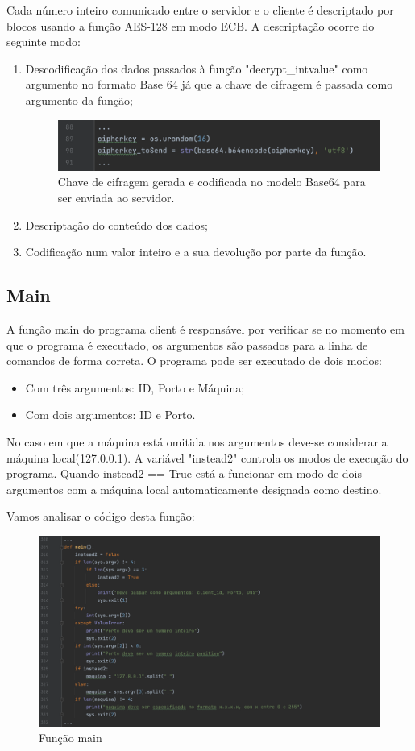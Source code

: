 \documentclass{report}
\begin{document}
Cada número inteiro comunicado entre o servidor e o cliente é descriptado por blocos usando a função AES-128 em modo ECB. A descriptação ocorre do seguinte modo:
\begin{enumerate}
\item Descodificação dos dados passados à função "decrypt\_intvalue" como argumento no formato Base 64 já que a chave de cifragem é passada como argumento da função;
\begin{figure}[H]
        \centering
        \includegraphics[scale=0.40]{chaveCifra}      
        \caption{Chave de cifragem gerada e codificada no modelo Base64 para ser enviada ao servidor.}
\end{figure}
\item Descriptação do conteúdo dos dados;
\item Codificação num valor inteiro e a sua devolução por parte da função.
\end{enumerate}
\subsection{Main}
A função main do programa client é responsável por verificar se no momento em que o programa é executado, os argumentos são passados para a linha de comandos de forma correta.
O programa pode ser executado de dois modos:
\begin{itemize}
\item Com três argumentos: ID, Porto e Máquina;
\item Com dois argumentos: ID e Porto.
\end{itemize}
No caso em que a máquina está omitida nos argumentos deve-se considerar a máquina local(127.0.0.1).
A variável "instead2" controla os modos de execução do programa. Quando instead2 == True está a funcionar em modo de dois argumentos com a máquina local automaticamente designada como destino.

Vamos analisar o código desta função:
\begin{figure}[H]
        \centering
        \includegraphics[scale=0.40]{main1}      
        \caption{Função main}
\end{figure}
\end{document}

